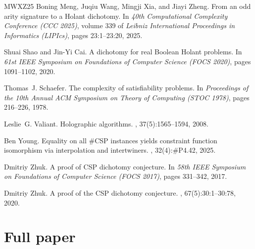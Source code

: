 \documentclass[11pt,letterpaper,onecolumn]{article}
\theoremstyle{plain}
\theoremstyle{definition}
\theoremstyle{remark}
\begin{document}
\begin{thebibliography}{MWXZ25}
Boning Meng, Juqiu Wang, Mingji Xia, and Jiayi Zheng.
\newblock From an odd arity signature to a {Holant} dichotomy.
\newblock In {\em 40th Computational Complexity Conference (CCC 2025)}, volume
  339 of {\em Leibniz International Proceedings in Informatics (LIPIcs)}, pages
  23:1--23:20, 2025.

Shuai Shao and Jin-Yi Cai.
\newblock A dichotomy for real {Boolean} {Holant} problems.
\newblock In {\em 61st IEEE Symposium on Foundations of Computer Science (FOCS
  2020)}, pages 1091--1102, 2020.

Thomas~J. Schaefer.
\newblock The complexity of satisfiability problems.
\newblock In {\em Proceedings of the 10th Annual ACM Symposium on Theory of
  Computing (STOC 1978)}, pages 216--226, 1978.

Leslie~G. Valiant.
\newblock Holographic algorithms.
, 37(5):1565--1594, 2008.

Ben Young.
\newblock Equality on all {{\#CSP}} instances yields constraint function
  isomorphism via interpolation and intertwiners.
, 32(4):{\#P4.42}, 2025.

Dmitriy Zhuk.
\newblock A proof of {CSP} dichotomy conjecture.
\newblock In {\em 58th IEEE Symposium on Foundations of Computer Science (FOCS
  2017)}, pages 331--342, 2017.

Dmitriy Zhuk.
\newblock A proof of the {CSP} dichotomy conjecture.
, 67(5):30:1--30:78, 2020.

\end{thebibliography}


\clearpage
\setcounter{section}{0}
\setcounter{equation}{0}
\setcounter{figure}{0}
\setcounter{table}{0}
\setcounter{footnote}{0}
\setcounter{page}{1}
\renewcommand{\thepage}{F-\arabic{page}}
\renewcommand{\thesection}{F.\arabic{section}}
\renewcommand{\theHsection}{full.\arabic{section}}
\renewcommand{\theequation}{F.\arabic{equation}}
\renewcommand{\theHequation}{full.\arabic{equation}}
\renewcommand{\thefigure}{F.\arabic{figure}}
\renewcommand{\theHfigure}{full.\arabic{figure}}
\renewcommand{\thetable}{F.\arabic{table}}
\renewcommand{\theHtable}{full.\arabic{table}}
\section*{Full paper}
\end{document}
